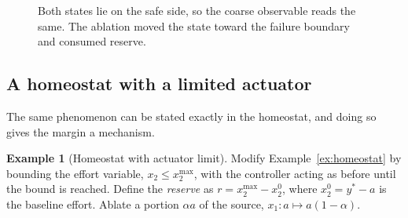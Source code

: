 \documentclass[11pt]{article}
\theoremstyle{definition}
\newtheorem{example}[theorem]{Example}
\theoremstyle{remark}
\begin{document}
\begin{figure}[ht]
\centering
{}
\caption{Both states lie on the safe side, so the coarse observable reads the same. The ablation moved the state toward the failure boundary and consumed reserve.}
\end{figure}

\subsection{A homeostat with a limited actuator}

The same phenomenon can be stated exactly in the homeostat, and doing so gives the margin a mechanism.

\begin{example}[Homeostat with actuator limit]\label{ex:limit}
Modify Example~\ref{ex:homeostat} by bounding the effort variable, $x_2\le x_2^{\max}$, with the controller acting as before until the bound is reached. Define the \emph{reserve} as $r=x_2^{\max}-x_2^0$, where $x_2^0=y^*-a$ is the baseline effort. Ablate a portion $\alpha a$ of the source, $x_1:a\mapsto a(1-\alpha)$.
\end{example}
\end{document}
